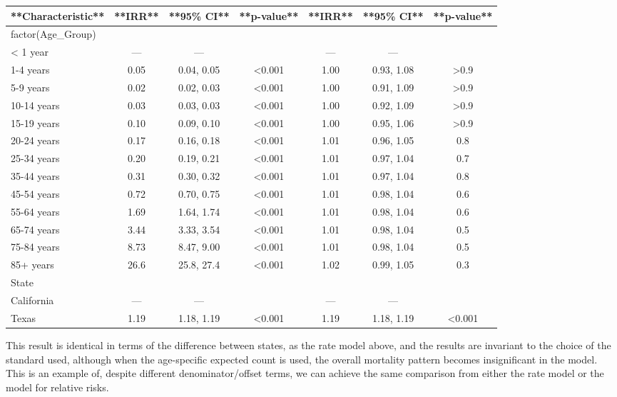 \documentclass[
  letterpaper,
  DIV=11,
  numbers=noendperiod]{scrreprt}
\begin{document}
\begin{tabular}{l|c|c|c|c|c|c}
\hline
**Characteristic** & **IRR** & **95\% CI** & **p-value** & **IRR** & **95\% CI** & **p-value**\\
\hline
factor(Age\_Group) &  &  &  &  &  & \\
\hline
< 1 year & — & — &  & — & — & \\
\hline
1-4 years & 0.05 & 0.04, 0.05 & <0.001 & 1.00 & 0.93, 1.08 & >0.9\\
\hline
5-9 years & 0.02 & 0.02, 0.03 & <0.001 & 1.00 & 0.91, 1.09 & >0.9\\
\hline
10-14 years & 0.03 & 0.03, 0.03 & <0.001 & 1.00 & 0.92, 1.09 & >0.9\\
\hline
15-19 years & 0.10 & 0.09, 0.10 & <0.001 & 1.00 & 0.95, 1.06 & >0.9\\
\hline
20-24 years & 0.17 & 0.16, 0.18 & <0.001 & 1.01 & 0.96, 1.05 & 0.8\\
\hline
25-34 years & 0.20 & 0.19, 0.21 & <0.001 & 1.01 & 0.97, 1.04 & 0.7\\
\hline
35-44 years & 0.31 & 0.30, 0.32 & <0.001 & 1.01 & 0.97, 1.04 & 0.8\\
\hline
45-54 years & 0.72 & 0.70, 0.75 & <0.001 & 1.01 & 0.98, 1.04 & 0.6\\
\hline
55-64 years & 1.69 & 1.64, 1.74 & <0.001 & 1.01 & 0.98, 1.04 & 0.6\\
\hline
65-74 years & 3.44 & 3.33, 3.54 & <0.001 & 1.01 & 0.98, 1.04 & 0.5\\
\hline
75-84 years & 8.73 & 8.47, 9.00 & <0.001 & 1.01 & 0.98, 1.04 & 0.5\\
\hline
85+ years & 26.6 & 25.8, 27.4 & <0.001 & 1.02 & 0.99, 1.05 & 0.3\\
\hline
State &  &  &  &  &  & \\
\hline
California & — & — &  & — & — & \\
\hline
Texas & 1.19 & 1.18, 1.19 & <0.001 & 1.19 & 1.18, 1.19 & <0.001\\
\hline
\end{tabular}

This result is identical in terms of the difference between states, as
the rate model above, and the results are invariant to the choice of the
standard used, although when the age-specific expected count is used,
the overall mortality pattern becomes insignificant in the model. This
is an example of, despite different denominator/offset terms, we can
achieve the same comparison from either the rate model or the model for
relative risks.
\end{document}
